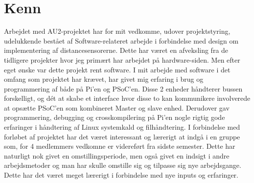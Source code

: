 \section{Kenn}\label{sec:opnaaede_erfaringer_ke}

Arbejdet med AU2-projektet har for mit vedkomme, udover projektstyring, udelukkende bestået af Software-relateret arbejde i forbindelse med design om implementering af distancesensorerne. 
Dette har været en afveksling fra de tidligere projekter hvor jeg primært har arbejdet på hardware-siden. 
Men efter eget ønske var dette projekt rent software.
I mit arbejde med software i det omfang som projektet har krævet, har givet mig erfaring i brug og programmering af \IIC både på Pi'en og PSoC'en. 
Disse 2 enheder håndterer bussen forskelligt, og dét at skabe et interface hvor disse to kan kommunikere involverede at opsætte PSoC'en som kombineret Master og slave enhed. Derudover gav programmering, debugging og crosskompilering på Pi'en nogle rigtig gode erfaringer i håndtering af Linux systemkald og filhåndtering.
I forbindelse med forløbet af projektet har det været interessant og lærerigt at indgå i en gruppe som, for 4 medlemmers vedkomne er videreført fra sidste semester. 
Dette har naturligt nok givet en omstillingsperiode, men også givet en indsigt i andre arbejdsmetoder og man har skulle omstille sig og tilpasse sig nye arbejdsgange. 
Dette har det været meget lærerigt i forbindelse med nye inputs og erfaringer. 